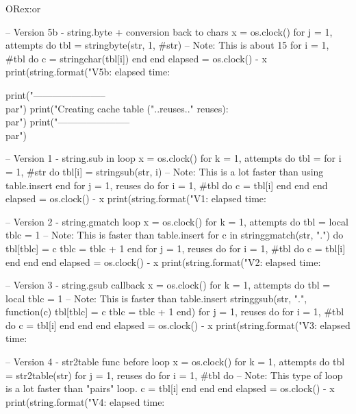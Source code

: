 \begin{texexample}{OR}{ex:or}
\begin{luacode}
-- Version 5b - string.byte + conversion back to chars
x = os.clock()
for j = 1, attempts do
    tbl = {stringbyte(str, 1, #str)} -- Note: This is about 15%
    for i = 1, #tbl do
        c = stringchar(tbl[i])
    end
end
elapsed = os.clock() - x
print(string.format("V5b: elapsed time: %

print("-----------------------\\par")
print("Creating cache table ("..reuses.." reuses):\\par")
print("-----------------------\\par")

-- Version 1 - string.sub in loop
x = os.clock()
for k = 1, attempts do
    tbl = {}
    for i = 1, #str do
        tbl[i] = stringsub(str, i) -- Note: This is a lot faster than using table.insert
    end
    for j = 1, reuses do
        for i = 1, #tbl do
            c = tbl[i]
        end
    end
end
elapsed = os.clock() - x
print(string.format("V1: elapsed time: %

-- Version 2 - string.gmatch loop
x = os.clock()
for k = 1, attempts do
    tbl = {}
    local tblc = 1 -- Note: This is faster than table.insert
    for c in stringgmatch(str, ".") do
        tbl[tblc] = c
        tblc = tblc + 1
    end
    for j = 1, reuses do
        for i = 1, #tbl do
            c = tbl[i]
        end
    end
end
elapsed = os.clock() - x
print(string.format("V2: elapsed time: %

-- Version 3 - string.gsub callback
x = os.clock()
for k = 1, attempts do
    tbl = {}
    local tblc = 1 -- Note: This is faster than table.insert
    stringgsub(str, ".", function(c)
        tbl[tblc] = c
        tblc = tblc + 1
    end)
    for j = 1, reuses do
        for i = 1, #tbl do
            c = tbl[i]
        end
    end
end
elapsed = os.clock() - x
print(string.format("V3: elapsed time: %

-- Version 4 - str2table func before loop
x = os.clock()
for k = 1, attempts do
    tbl = str2table(str)
    for j = 1, reuses do
        for i = 1, #tbl do -- Note: This type of loop is a lot faster than "pairs" loop.
            c = tbl[i]
        end
    end
end
elapsed = os.clock() - x
print(string.format("V4: elapsed time: %


\end{luacode}
\end{texexample}
